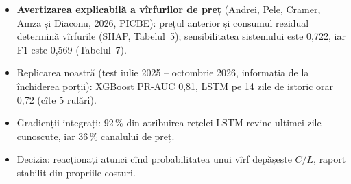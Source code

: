 \begin{itemize}\setlength{\itemsep}{2pt}
  \item \textbf{Avertizarea explicabilă a vîrfurilor de preț} (Andrei, Pele, Cramer, Amza și Diaconu, 2026, PICBE): prețul anterior și consumul rezidual determină vîrfurile (SHAP, Tabelul~5); sensibilitatea sistemului este 0,722, iar F1 este 0,569 (Tabelul~7).
  \item Replicarea noastră (test iulie 2025 -- octombrie 2026, informația de la închiderea porții): XGBoost PR-AUC 0,81, LSTM pe 14 zile de istoric orar 0,72 (cîte 5 rulări).
  \item Gradienții integrați: 92\,\% din atribuirea rețelei LSTM revine ultimei zile cunoscute, iar 36\,\% canalului de preț.
  \item Decizia: reacționați atunci cînd probabilitatea unui vîrf depășește $C/L$, raport stabilit din propriile costuri.
\end{itemize}
